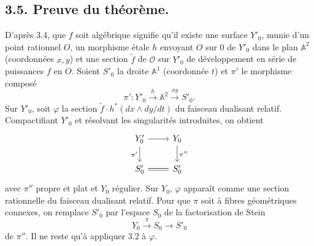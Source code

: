 \documentclass[11pt]{article}
\newcommand{\OO}{\mathcal O}
\newcommand{\Aaff}{\mathbb A}
\begin{document}
\subsection*{3.5. Preuve du théorème.}
D'après 3.4, que $f$ soit algébrique signifie qu'il existe une surface $Y'_0$, munie d'un point rationnel $O$, un morphisme étale $h$ envoyant $O$ sur $0$ de $Y'_0$ dans le plan $\Aaff^2$ (coordonnées $x,y$) et une section $\widetilde f$ de $\OO$ sur $Y'_0$ de développement en série de puissances $f$ en $O$. Soient $S'_0$ la droite $\Aaff^1$ (coordonnée $t$) et $\pi'$ le morphisme composé
\[
        \pi':Y'_0\xrightarrow{h}\Aaff^2\xrightarrow{xy}S'_0.
\]
Sur $Y'_0$, soit $\varphi$ la section $\widetilde f\cdot h^*(dx\wedge dy/dt)$ du faisceau dualisant relatif. Compactifiant $Y'_0$ et résolvant les singularités introduites, on obtient
\[
\begin{tikzcd}
Y'_0 \arrow[r] \arrow[d,"\pi'"'] & Y_0 \arrow[d,"\pi''"] \\
S'_0 \arrow[r,equal] & S'_0
\end{tikzcd}
\]
avec $\pi''$ propre et plat et $Y_0$ régulier. Sur $Y_0$, $\varphi$ apparaît comme une section rationnelle du faisceau dualisant relatif. Pour que $\pi$ soit à fibres géométriques connexes, on remplace $S'_0$ par l'espace $S_0$ de la factorisation de Stein
\[
        Y_0\xrightarrow{\pi}S_0\longrightarrow S'_0
\]
de $\pi''$. Il ne reste qu'à appliquer 3.2 à $\varphi$.
\end{document}
